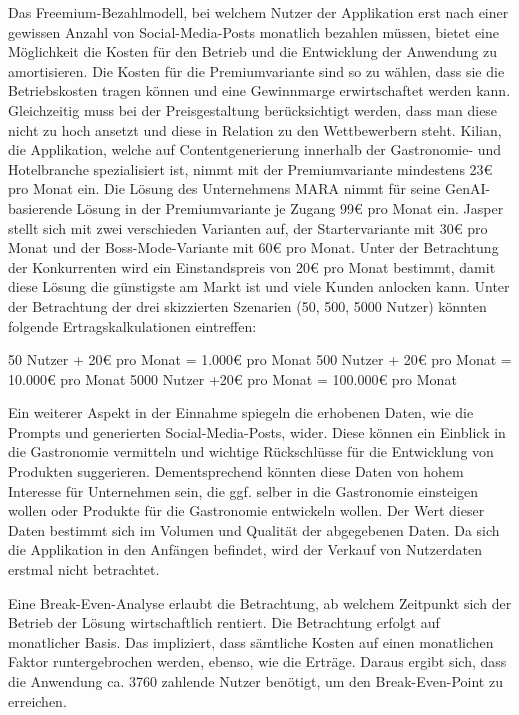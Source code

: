 Das Freemium-Bezahlmodell, bei welchem Nutzer der Applikation erst nach einer gewissen Anzahl von Social-Media-Posts monatlich bezahlen müssen, bietet eine Möglichkeit die Kosten für den Betrieb und die Entwicklung der Anwendung zu amortisieren.
Die Kosten für die Premiumvariante sind so zu wählen, dass sie die Betriebskosten tragen können und eine Gewinnmarge erwirtschaftet werden kann.
Gleichzeitig muss bei der Preisgestaltung berücksichtigt werden, dass man diese nicht zu hoch ansetzt und diese in Relation zu den Wettbewerbern steht.
Kilian, die Applikation, welche auf Contentgenerierung innerhalb der Gastronomie- und Hotelbranche spezialisiert ist, nimmt mit der Premiumvariante mindestens 23€ pro Monat ein.
Die Lösung des Unternehmens MARA nimmt für seine GenAI-basierende Lösung in der Premiumvariante je Zugang 99€ pro Monat ein.
Jasper stellt sich mit zwei verschieden Varianten auf, der Startervariante mit 30€ pro Monat und der Boss-Mode-Variante mit 60€ pro Monat.
Unter der Betrachtung der Konkurrenten wird ein Einstandspreis von 20€ pro Monat bestimmt, damit diese Lösung die günstigste am Markt ist und viele Kunden anlocken kann.
Unter der Betrachtung der drei skizzierten Szenarien (50, 500, 5000 Nutzer) könnten folgende Ertragskalkulationen eintreffen:

50 Nutzer + 20€ pro Monat = 1.000€ pro Monat
500 Nutzer + 20€ pro Monat = 10.000€ pro Monat
5000 Nutzer +20€ pro Monat = 100.000€ pro Monat


Ein weiterer Aspekt in der Einnahme spiegeln die erhobenen Daten, wie die Prompts und generierten Social-Media-Posts, wider.
Diese können ein Einblick in die Gastronomie vermitteln und wichtige Rückschlüsse für die Entwicklung von Produkten suggerieren.
Dementsprechend könnten diese Daten von hohem Interesse für Unternehmen sein, die ggf. selber in die Gastronomie einsteigen wollen oder Produkte für die Gastronomie entwickeln wollen.
Der Wert dieser Daten bestimmt sich im Volumen und Qualität der abgegebenen Daten.
Da sich die Applikation in den Anfängen befindet, wird der Verkauf von Nutzerdaten erstmal nicht betrachtet.

Eine Break-Even-Analyse erlaubt die Betrachtung, ab welchem Zeitpunkt sich der Betrieb der Lösung wirtschaftlich rentiert.
Die Betrachtung erfolgt auf monatlicher Basis.
Das impliziert, dass sämtliche Kosten auf einen monatlichen Faktor runtergebrochen werden, ebenso, wie die Erträge.
Daraus ergibt sich, dass die Anwendung ca. 3760 zahlende Nutzer benötigt, um den Break-Even-Point zu erreichen.

